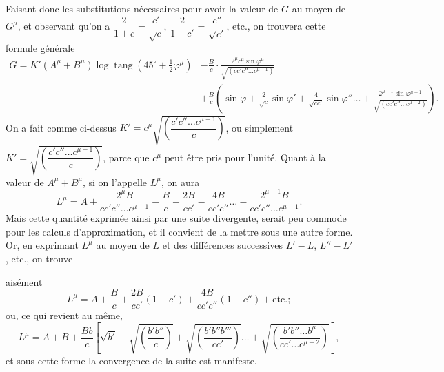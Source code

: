 \documentclass{article}
\begin{document}
Faisant donc les substitutions nécessaires pour avoir la valeur de $G$ au moyen de $G^{\mu}$, et observant qu'on a $\dfrac{2}{1+c}=\dfrac{c'}{\sqrt{c}}$, $\dfrac{2}{1+c'}=\dfrac{c''}{\sqrt{c'}}$, etc., on trouvera cette formule générale
\[ \begin{aligned} G=K'(A^{\mu}+B^{\mu})\log\operatorname{tang}(45^{\circ}+\tfrac{1}{2}\varphi^{\mu})&-\frac{B}{c}\cdot\frac{2^{\mu}c^{\mu}\sin\varphi^{\mu}}{\sqrt{(cc'c''\ldots c^{\mu-1})}}\\ &+\frac{B}{c}\left(\sin\varphi+\frac{2}{\sqrt{c}}\sin\varphi'+\frac{4}{\sqrt{cc'}}\sin\varphi''\ldots+\frac{2^{\mu-1}\sin\varphi^{\mu-1}}{\sqrt{(cc'c''\ldots c^{\mu-2})}}\right). \end{aligned} \]
On a fait comme ci-dessus $K'=c^{\mu}\sqrt{\left(\dfrac{c'c''\ldots c^{\mu-1}}{c}\right)}$, ou simplement $K'=\sqrt{\left(\dfrac{c'c''\ldots c^{\mu-1}}{c}\right)}$, parce que $c^{\mu}$ peut être pris pour l'unité. Quant à la valeur de $A^{\mu}+B^{\mu}$, si on l'appelle $L^{\mu}$, on aura
\[ L^{\mu}=A+\frac{2^{\mu}B}{cc'c''\ldots c^{\mu-1}}-\frac{B}{c}-\frac{2B}{cc'}-\frac{4B}{cc'c''}\ldots-\frac{2^{\mu-1}B}{cc'c''\ldots c^{\mu-1}}. \]
Mais cette quantité exprimée ainsi par une suite divergente, serait peu commode pour les calculs d'approximation, et il convient de la mettre sous une autre forme. Or, en exprimant $L^{\mu}$ au moyen de $L$ et des différences successives $L'-L$, $L''-L'$, etc., on trouve

aisément
\[ L^{\mu}=A+\frac{B}{c}+\frac{2B}{cc'}(1-c')+\frac{4B}{cc'c''}(1-c'')+\text{etc.}; \]
ou, ce qui revient au même,
\[ L^{\mu}=A+B+\frac{Bb}{c}\left[\sqrt{b'}+\sqrt{\left(\frac{b'b''}{c}\right)}+\sqrt{\left(\frac{b'b''b'''}{cc'}\right)}\ldots+\sqrt{\left(\frac{b'b''\ldots b^{\mu}}{cc'\ldots c^{\mu-2}}\right)}\right], \]
et sous cette forme la convergence de la suite est manifeste.
\end{document}
